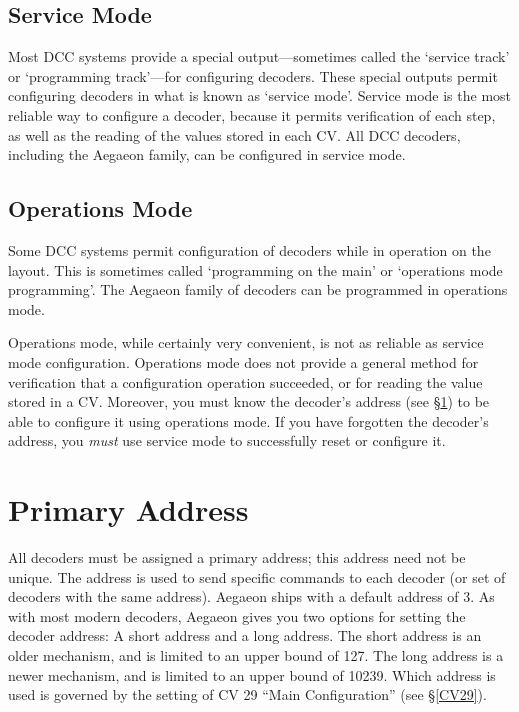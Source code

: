 \documentclass[12pt,letterpaper,draft]{memoir} %
\begin{document}
\subsection{Service Mode}

Most DCC systems provide a special output---sometimes called the `service track' or `programming track'---for configuring decoders. These special outputs permit configuring decoders in what is known as `service mode'. Service mode is the most reliable way to configure a decoder, because it permits verification of each step, as well as the reading of the values stored in each CV. All DCC decoders, including the Aegaeon family, can be configured in service mode.

\subsection{Operations Mode}

Some DCC systems permit configuration of decoders while in operation on the layout. This is sometimes called `programming on the main' or `operations mode programming'. The Aegaeon family of decoders can be programmed in operations mode.

Operations mode, while certainly very convenient, is not as reliable as service mode configuration. Operations mode does not provide a general method for verification that a configuration operation succeeded, or for reading the value stored in a CV. Moreover, you must know the decoder's address (see \S\ref{PrimaryAddress}) to be able to configure it using operations mode. If you have forgotten the decoder's address, you \textit{must} use service mode to successfully reset or configure it.

\section{Primary Address}
\label{PrimaryAddress}
All decoders must be assigned a primary address; this address need not be unique. The address is used to send specific commands to each decoder (or set of decoders with the same address). Aegaeon ships with a default address of 3. As with most modern decoders, Aegaeon gives you two options for setting the decoder address: A short address and a long address. The short address is an older mechanism, and is limited to an upper bound of 127. The long address is a newer mechanism, and is limited to an upper bound of 10239. Which address is used is governed by the setting of CV 29 ``Main Configuration'' (see \S\ref{CV29}).
\end{document}
